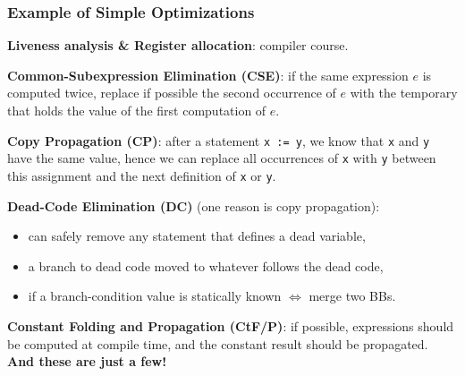 \documentclass{beamer}
\newcommand{\emp}[1]{\textcolor{DikuRed}{ #1}}
\begin{document}
\begin{frame}[fragile,t]
    \frametitle{Example of Simple Optimizations}

\emp{\bf Liveness analysis \& Register allocation}: compiler course.

\bigskip

\emp{\bf Common-Subexpression Elimination (CSE)}: if the same expression
$e$ is computed twice, replace if possible the second occurrence of $e$
with the temporary that holds the value of the first computation of $e$.

\bigskip

\emp{\bf Copy Propagation (CP)}: after a statement {\tt x~:=~y}, 
we know that {\tt x} and {\tt y} have the same value, hence we can replace 
all occurrences of {\tt x} with {\tt y} between this assignment and the next 
definition of {\tt x} or {\tt y}.

\bigskip

\emp{\bf Dead-Code Elimination (DC)} (one reason is copy propagation):
\begin{itemize}
    \item can safely remove any statement that defines a dead variable,
    \item a branch to dead code moved to whatever follows the dead code,
    \item if a branch-condition value is statically known $\Leftrightarrow$ merge two BBs.
\end{itemize}

\bigskip

\emp{\bf Constant Folding and Propagation (CtF/P)}: if possible,
expressions should be computed at compile time, and the constant
result should be propagated. {\bf And these are just a few!}


\end{frame}
\end{document}
